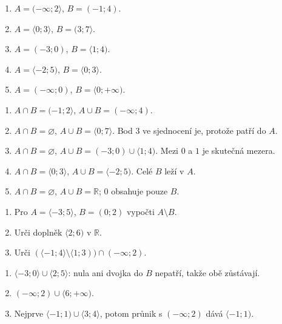 \documentclass[11pt,a4paper]{article}
\begin{document}
\begin{zadaniReseniBox}[title={Samostatná práce 1}]
\begin{enumerate}[label=\alph*)]
\item $A=(-\infty;2\rangle$, $B=(-1;4)$.
\item $A=\langle0;3\rangle$, $B=(3;7\rangle$.
\item $A=(-3;0)$, $B=\langle1;4)$.
\item $A=\langle-2;5)$, $B=\langle0;3\rangle$.
\item $A=(-\infty;0)$, $B=\langle0;+\infty)$.
\end{enumerate}
\tcblower
\begin{enumerate}[label=\alph*)]
\item $A\cap B=(-1;2\rangle$, $A\cup B=(-\infty;4)$.
\item $A\cap B=\varnothing$, $A\cup B=\langle0;7\rangle$.
Bod $3$ ve sjednocení je, protože patří do $A$.
\item $A\cap B=\varnothing$, $A\cup B=(-3;0)\cup\langle1;4)$.
Mezi $0$ a $1$ je skutečná mezera.
\item $A\cap B=\langle0;3\rangle$, $A\cup B=\langle-2;5)$.
Celé $B$ leží v $A$.
\item $A\cap B=\varnothing$, $A\cup B=\mathbb R$;
$0$ obsahuje pouze $B$.
\end{enumerate}
\end{zadaniReseniBox}

\begin{zadaniReseniBox}[title={Samostatná práce 2}]
\begin{enumerate}[label=\alph*)]
\item Pro $A=\langle-3;5\rangle$, $B=(0;2)$ vypočti $A\setminus B$.
\item Urči doplněk $\langle2;6)$ v $\mathbb R$.
\item Urči $(\langle-1;4\rangle\setminus\langle1;3))\cap(-\infty;2)$.
\end{enumerate}
\tcblower
\begin{enumerate}[label=\alph*)]
\item $\langle-3;0\rangle\cup\langle2;5\rangle$:
nula ani dvojka do $B$ nepatří, takže obě zůstávají.
\item $(-\infty;2)\cup\langle6;+\infty)$.
\item Nejprve $\langle-1;1)\cup\langle3;4\rangle$, potom průnik
s $(-\infty;2)$ dává $\langle-1;1)$.
\end{enumerate}
\end{zadaniReseniBox}
\end{document}
